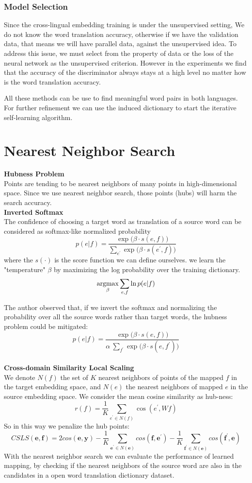 \subsubsection{Model Selection}
Since the cross-lingual embedding training is under the unsupervised setting, We do not know the word translation accuracy, otherwise if we have the validation data, that means we will have parallel data, against the unsupervised idea. To address this issue, we must select from the property of data or the loss of the neural network as the unsupervised criterion. However in the experiments we find that the accuracy of the discriminator always stays at a high level no matter how is the word translation accuracy. 

All these methods can be use to find meaningful word pairs in both languages. For further refinement we can use the induced dictionary to start the iterative self-learning algorithm. 

\section{Nearest Neighbor Search}
\textbf{Hubness Problem}\\
Points are tending to be nearest neighbors of many points in high-dimensional space. Since we use nearest neighbor search, those points (hubs) will harm the search accuracy.\\

\textbf{Inverted Softmax}\\
The confidence of choosing a target word as translation of a source word can be considered as softmax-like normalized probability
\[ p(e|f) = \frac{\exp{\Big(\beta \cdot  s(e,f)\Big)}}{\sum_{e^{\prime}} {\exp{\Big(\beta \cdot s(e^{\prime}, f)\Big)}}} \]
where the $s(\cdot)$ is the score function we can define ourselves.
we learn the "temperature" $\beta$ by maximizing the log probability over the training dictionary. 
\[ \underset{\beta}{\operatorname{argmax}} \sum_{e,f} \ln p(e|f)  \]

The author observed that, if we invert the softmax and normalizing the probability over all the source words rather than target words, the hubness problem could be mitigated:
\[ p(e|f) = \frac{\exp{\Big(\beta \cdot  s(e,f)\Big)}}{\alpha \  \sum_{f^{\prime}} {\exp{\Big(\beta \cdot s(e, f^{\prime})\Big)}}}\]\\


\textbf{Cross-domain Similarity Local Scaling}\\
We denote ${N(f)}$ the set of ${K}$ nearest neighbors of points of the mapped $f$ in the target embedding space, and ${N(e)}$ the nearest neighbors of mapped ${e}$ in the source embedding space. We consider the mean cosine similarity as hub-ness:
\[ r(f)= \frac{1}{K} \sum_{e^{\prime} \in N(f)} \cos(e^{\prime}, Wf)\]
So in this way we penalize the hub points:
\[ CSLS(\bm{e}, \bm{f}) = 2 cos(\bm{e}, \bm{y}) - \frac{1}{K} \sum_{\bm{e^{\prime}} \in N(\bm{e})} cos(\bm{f}, \bm{e^{\prime}})- \frac{1}{K} \sum_{\bm{f^{\prime}} \in N(\bm{e})} cos(\bm{f^{\prime}}, \bm{e}) \]
With the nearest neighbor search we can evaluate the performance of learned mapping, by checking if the nearest neighbors of the source word are also in the candidates in a open word translation dictionary dataset.\\
